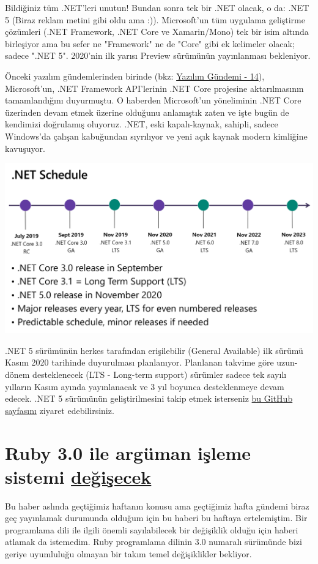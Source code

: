 \documentclass[11pt]{article}
\begin{document}
Bildiğiniz tüm .NET'leri unutun! Bundan sonra tek bir .NET olacak, o da: .NET 5
(Biraz reklam metini gibi oldu ama :)). Microsoft'un tüm uygulama geliştirme
çözümleri (.NET Framework, .NET Core ve Xamarin/Mono) tek bir isim altında
birleşiyor ama bu sefer ne "Framework" ne de "Core" gibi ek kelimeler olacak;
sadece ".NET 5". 2020'nin ilk yarısı Preview sürümünün yayınlanması bekleniyor.

Önceki yazılım gündemlerinden birinde (bkz: \href{../14/yazilim-gundemi-14.pdf}{Yazılım Gündemi - 14}),
Microsoft'un, .NET Framework API'lerinin .NET Core projesine aktarılmasının
tamamlandığını duyurmuştu. O haberden Microsoft'un yöneliminin .NET Core
üzerinden devam etmek üzerine olduğunu anlamıştık zaten ve işte bugün de
kendimizi doğrulamış oluyoruz. .NET, eski kapalı-kaynak, sahipli, sadece
Windows'da çalışan kabuğundan sıyrılıyor ve yeni açık kaynak modern kimliğine
kavuşuyor.

\begin{center}
\includegraphics[width=.9\linewidth]{gorseller/dotnet_schedule.png}
\end{center}

.NET 5 sürümünün herkes tarafından erişilebilir (General Available) ilk sürümü
Kasım 2020 tarihinde duyurulması planlanıyor. Planlanan takvime göre uzun-dönem
desteklenecek (LTS - Long-term support) sürümler sadece tek sayılı yılların
Kasım ayında yayınlanacak ve 3 yıl boyunca desteklenmeye devam edecek. .NET 5
sürümünün geliştirilmesini takip etmek isterseniz \href{https://github.com/dotnet/corefx/milestone/44}{bu GitHub sayfasını} ziyaret
edebilirsiniz.
\section{Ruby 3.0 ile argüman işleme sistemi \href{https://www.ruby-lang.org/en/news/2019/12/12/separation-of-positional-and-keyword-arguments-in-ruby-3-0/}{değişecek}}
\label{sec:org5e805ec}
Bu haber aslında geçtiğimiz haftanın konusu ama geçtiğimiz hafta gündemi biraz
geç yayınlamak durumunda olduğum için bu haberi bu haftaya ertelemiştim. Bir
programlama dili ile ilgili önemli sayılabilecek bir değişiklik olduğu için
haberi atlamak da istemedim. Ruby programlama dilinin 3.0 numaralı sürümünde
bizi geriye uyumluluğu olmayan bir takım temel değişiklikler bekliyor.
\end{document}
